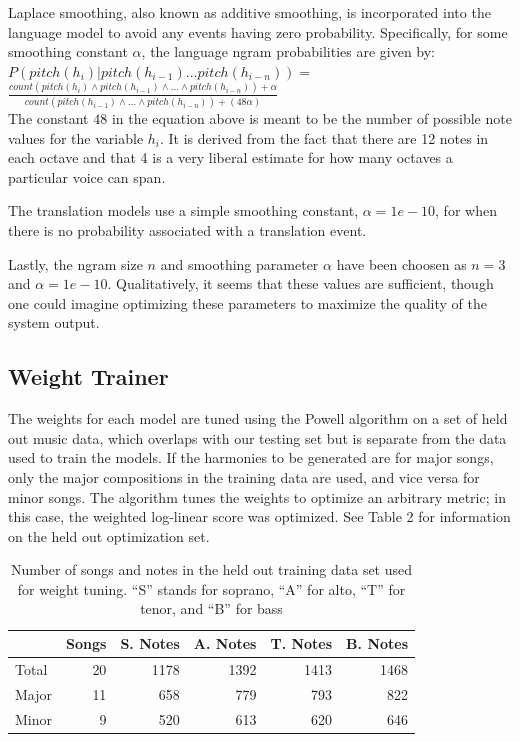 \documentclass{sig-alternate}
\begin{document}
Laplace smoothing, also known as additive smoothing, is incorporated into the language model to avoid any events having zero probability. Specifically, for some smoothing constant $\alpha$, the language ngram probabilities are given by: \\

$P(pitch(h_{i}) | pitch(h_{i - 1}) ... pitch(h_{i - n})) = $\\

$\frac{count(pitch(h_{i}) \wedge pitch(h_{i - 1}) \wedge ... \wedge pitch(h_{i - n})) + \alpha}{count(pitch(h_{i - 1}) \wedge ... \wedge pitch(h_{i - n})) + (48\alpha)}$\\

The constant $48$ in the equation above is meant to be the number of possible note values for the variable $h_{i}$. It is derived from the fact that there are 12 notes in each octave and that 4 is a very liberal estimate for how many octaves a particular voice can span. 

The translation models use a simple smoothing constant, $\alpha = 1e-10$, for when there is no probability associated with a translation event.

Lastly, the ngram size $n$ and smoothing parameter $\alpha$ have been choosen as $n = 3$ and $\alpha = 1e-10$. Qualitatively, it seems that these values are sufficient, though one could imagine optimizing these parameters to maximize the quality of the system output.

\subsection{Weight Trainer}
The weights for each model are tuned using the Powell algorithm \cite{Koehn:2010:SMT:1734086} on a set of held out music data, which overlaps with our testing set but is separate from the data used to train the models. If the harmonies to be generated are for major songs, only the major compositions in the training data are used, and vice versa for minor songs. The algorithm tunes the weights to optimize an arbitrary metric; in this case, the weighted log-linear score was optimized. See Table 2 for information on the held out optimization set. 

\begin{table}[h]
  \begin{center}
      \begin{tabular}{| l | r | r | r | r | r |}
      \hline
       \  & Songs & S. Notes & A. Notes & T. Notes & B. Notes \\ \hline
       Total &  20 & 1178 & 1392 & 1413 & 1468 \\ 
       Major &  11 & 658 & 779 & 793 & 822 \\ 
       Minor & 9 & 520 & 613 & 620 & 646  \\ \hline
      \end{tabular}
  \end{center}
  \caption{Number of songs and notes in the held out training data set used for weight tuning. ``S'' stands for soprano, ``A'' for alto, ``T'' for tenor, and ``B'' for bass}
\end{table}
\end{document}
